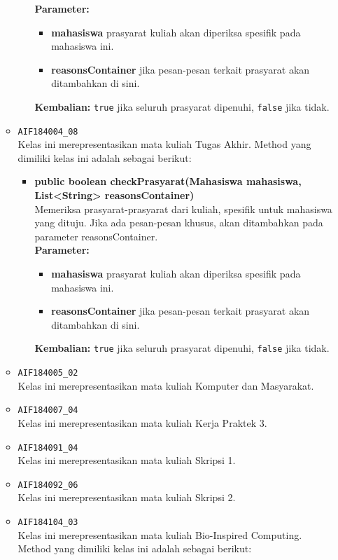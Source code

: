 \begin{enumerate}
\begin{itemize}
\begin{itemize}
			\textbf{Parameter:}
			\begin{itemize}
				\item \textbf{mahasiswa} prasyarat kuliah akan diperiksa spesifik pada mahasiswa ini.
				\item \textbf{reasonsContainer} jika pesan-pesan terkait prasyarat akan ditambahkan di sini.
			\end{itemize}
			\textbf{Kembalian:} \texttt{true} jika seluruh prasyarat dipenuhi, \texttt{false} jika tidak.
		\end{itemize}
		\item \texttt{AIF184004\_08} \\
		Kelas ini merepresentasikan mata kuliah Tugas Akhir. Method yang dimiliki kelas ini adalah sebagai berikut: 
		\begin{itemize}
			\item \textbf{public boolean checkPrasyarat(Mahasiswa mahasiswa, List<String> reasonsContainer)}\\
			Memeriksa prasyarat-prasyarat dari kuliah, spesifik untuk mahasiswa yang dituju. Jika ada pesan-pesan khusus, akan ditambahkan pada parameter reasonsContainer.\\
			\textbf{Parameter:}
			\begin{itemize}
				\item \textbf{mahasiswa} prasyarat kuliah akan diperiksa spesifik pada mahasiswa ini.
				\item \textbf{reasonsContainer} jika pesan-pesan terkait prasyarat akan ditambahkan di sini.
			\end{itemize}
			\textbf{Kembalian:} \texttt{true} jika seluruh prasyarat dipenuhi, \texttt{false} jika tidak.
		\end{itemize}
		\item \texttt{AIF184005\_02} \\
		Kelas ini merepresentasikan mata kuliah Komputer dan Masyarakat.
		\item \texttt{AIF184007\_04} \\
		Kelas ini merepresentasikan mata kuliah Kerja Praktek 3.
		\item \texttt{AIF184091\_04} \\
		Kelas ini merepresentasikan mata kuliah Skripsi 1.
		\item \texttt{AIF184092\_06} \\
		Kelas ini merepresentasikan mata kuliah Skripsi 2.
		\item \texttt{AIF184104\_03} \\
		Kelas ini merepresentasikan mata kuliah Bio-Inspired Computing. Method yang dimiliki kelas ini adalah sebagai berikut: 

\end{itemize}
\end{enumerate}
